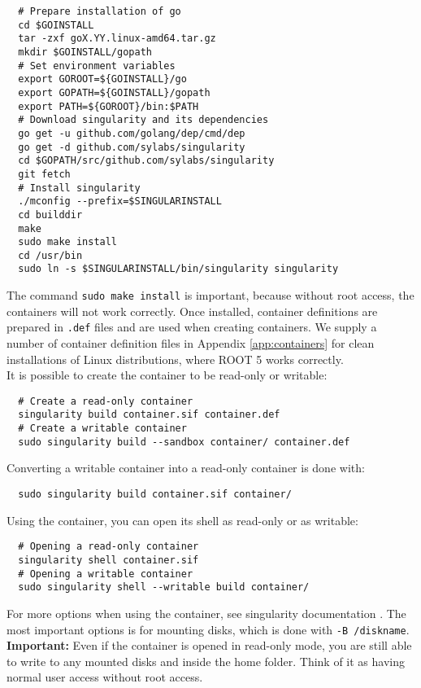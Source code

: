 \documentclass[12pt,a4paper]{report}
\begin{document}
\footnotesize
\begin{verbatim}
  # Prepare installation of go
  cd $GOINSTALL
  tar -zxf goX.YY.linux-amd64.tar.gz
  mkdir $GOINSTALL/gopath
  # Set environment variables
  export GOROOT=${GOINSTALL}/go
  export GOPATH=${GOINSTALL}/gopath
  export PATH=${GOROOT}/bin:$PATH
  # Download singularity and its dependencies
  go get -u github.com/golang/dep/cmd/dep
  go get -d github.com/sylabs/singularity
  cd $GOPATH/src/github.com/sylabs/singularity
  git fetch
  # Install singularity
  ./mconfig --prefix=$SINGULARINSTALL
  cd builddir
  make
  sudo make install
  cd /usr/bin
  sudo ln -s $SINGULARINSTALL/bin/singularity singularity
\end{verbatim}
\normalsize
The command \texttt{sudo make install} is important, because without root access, the containers will not work correctly. Once installed, container definitions are prepared in \texttt{.def} files and are used when creating containers. We supply a number of container definition files in Appendix \ref{app:containers} for clean installations of Linux distributions, where ROOT 5 works correctly.\\
It is possible to create the container to be read-only or writable:
\footnotesize
\begin{verbatim}
  # Create a read-only container
  singularity build container.sif container.def
  # Create a writable container
  sudo singularity build --sandbox container/ container.def
\end{verbatim}
\normalsize
Converting a writable container into a read-only container is done with:
\footnotesize
\begin{verbatim}
  sudo singularity build container.sif container/
\end{verbatim}
\normalsize
Using the container, you can open its shell as read-only or as writable:
\footnotesize
\begin{verbatim}
  # Opening a read-only container
  singularity shell container.sif
  # Opening a writable container
  sudo singularity shell --writable build container/
\end{verbatim}
\normalsize
For more options when using the container, see singularity documentation \cite{singularitydoc}. The most important options is for mounting disks, which is done with \linebreak\texttt{-B /diskname}.\\
\textbf{Important:} Even if the container is opened in read-only mode, you are still able to write to any mounted disks and inside the home folder. Think of it as having normal user access without root access.
\end{document}
